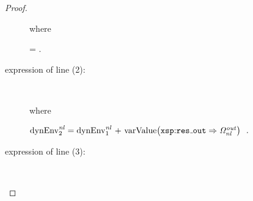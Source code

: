 \begin{proof}
\begin{description}
\begin{prooftreefunction}
    \end{prooftreefunction}%
    where 
    \begin{tree}
       = \dyn {} \enspace .
      \label{tree:dynEvn2}
    \end{tree}%

  \item[\LET expression of line (2):]~

    \begin{prooftreefunction}


    \end{prooftreefunction}%
    where 
    \begin{small}
      $\dynX{2}{nl} = \dynX{1}{nl} \envExtend{varValue}{\varNameR{res\mathunderscore{}out} \Rightarrow \omg{nl}{out}}
      \enspace .$
    \end{small}%
    

  \item[\FOR expression of line (3):]~

    \begin{prooftreefunction}



\end{prooftreefunction}
\end{description}
\end{proof}
